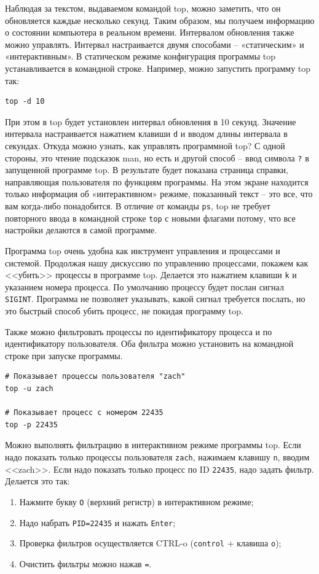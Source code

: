 \documentclass[a4paper,12pt,final,openany]{extbook}
\providecommand{\tightlist}{%
  \setlength{\itemsep}{0pt}\setlength{\parskip}{0pt}}
\begin{document}
Наблюдая за текстом, выдаваемом командой top, можно заметить, что он
обновляется каждые несколько секунд. Таким образом, мы получаем информацию
о состоянии компьютера в реальном времени. Интервалом обновления также
можно управлять. Интервал настраивается двумя способами -- «статическим»
и «интерактивным». В статическом режиме конфигурация программы top
устанавливается в командной строке. Например, можно запустить программу
top так:
\begin{verbatim}
top -d 10
\end{verbatim}

При этом в top будет установлен интервал обновления в 10 секунд. Значение интервала
настраивается нажатием клавиши \texttt{d} и вводом длины интервала в секундах. Откуда можно узнать, как управлять программной top? С одной
стороны, это чтение подсказок man, но есть и другой способ -- ввод
символа \texttt{?} в запущенной программе top. В результате будет
показана страница справки, направляющая пользователя по функциям
программы. На этом экране находится только информация об «интерактивном» режиме, показанный текст -- это все, что вам когда-либо понадобится. В
отличие от команды \texttt{ps}, top не требует повторного ввода в
командной строке \texttt{top} с новыми флагами потому, что все настройки
делаются в самой программе.

Программа top очень удобна как инструмент управления и процессами и
системой. Продолжая нашу дискуссию по управлению процессами, покажем как
<<убить>> процессы в программе top. Делается это нажатием клавиши
\texttt{k} и указанием номера процесса. По умолчанию процессу будет
послан сигнал \texttt{SIGINT}. Программа не позволяет указывать, какой
сигнал требуется послать, но это быстрый способ убить процесс, не
покидая программу top.

Также можно фильтровать процессы по идентификатору процесса и по
идентификатору пользователя. Оба фильтра можно установить на командной
строке при запуске программы.
\begin{verbatim}
# Показывает процессы пользователя "zach"
top -u zach

# Показывает процесс с номером 22435
top -p 22435
\end{verbatim}

Можно выполнять фильтрацию в интерактивном режиме программы top. Если
надо показать только процессы пользователя \texttt{zach}, нажимаем
клавишу \texttt{n}, вводим <<zach>>. Если надо показать только процесс по
ID \texttt{22435}, надо задать фильтр. Делается это так:
\begin{enumerate}
\tightlist
\item
  Нажмите букву \texttt{O} (верхний регистр) в интерактивном режиме;
\item
  Надо набрать \texttt{PID=22435} и нажать \texttt{Enter};
\item
  Проверка фильтров осуществляется CTRL-o (\texttt{control} + клавиша \texttt{o});
\item
  Очистить фильтры можно нажав \texttt{=}.
\end{enumerate}
\end{document}
